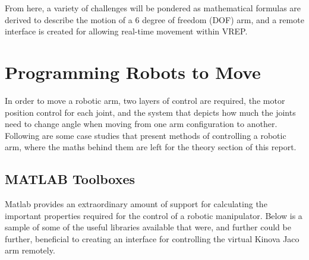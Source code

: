\documentclass[12pt,openany,a4paper]{book}
\begin{document}
From here, a variety of challenges will be pondered as mathematical formulas are derived to describe the motion of a 6 degree of freedom (DOF) arm, and a remote interface is created for allowing real-time movement within VREP.\\

%
%
\chapter{Programming Robots to Move}
In order to move a robotic arm, two layers of control are required, the motor position control for each joint, and the system that depicts how much the joints need to change angle when moving from one arm configuration to another. Following are some case studies that present methods of controlling a robotic arm, where the maths behind them are left for the theory section of this report.

\section{MATLAB Toolboxes}
Matlab provides an extraordinary amount of support for calculating the important properties required for the control of a robotic manipulator. Below is a sample of some of the useful libraries available that were, and further could be further, beneficial to creating an interface for controlling the virtual Kinova Jaco arm remotely.
\end{document}
